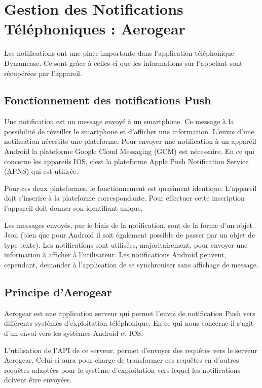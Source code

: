 \section{Gestion des Notifications Téléphoniques : Aerogear}

Les notifications ont une place importante dans l'application téléphonique Dynamease. Ce sont grâce à celles-ci que les informations sur l'appelant sont récupérées par l'appareil. 

\subsection{Fonctionnement des notifications Push}

Une notification est un message envoyé à un smartphone. Ce message à la possibilité de réveiller le smartphone et d'afficher une information. L'envoi d'une notification nécessite une plateforme. Pour envoyer une notification à un appareil Android la plateforme Google Cloud Messaging (GCM) est nécessaire. En ce qui concerne les appareils IOS, c'est la plateforme Apple Push Notification Service (APNS) qui est utilisée.

Pour ces deux plateformes, le fonctionnement est quasiment identique. L'appareil doit s'inscrire à la plateforme correspondante. Pour effectuer cette inscription l'appareil doit donner son identifiant unique.

Les messages envoyés, par le biais de la notification, sont de la forme d'un objet Json (bien que pour Android il soit également possible de passer par un objet de type texte). Les notifications sont utilisées, majoritairement, pour envoyer une information à afficher à l'utilisateur. Les notifications Android peuvent, cependant, demander à l'application de se synchroniser sans affichage de message.

\subsection{Principe d'Aerogear}

Aerogear est une application serveur qui permet l'envoi de notification Push vers différents systèmes d'exploitation téléphonique. En ce qui nous concerne il s'agit d'un envoi vers les systèmes Android et IOS.

L'utilisation de l'API de ce serveur, permet d'envoyer des requêtes vers le serveur Aerogear. Celui-ci aura pour charge de transformer ces requêtes en d'autres requêtes adaptées pour le système d'exploitation vers lequel les notifications doivent être envoyées.

